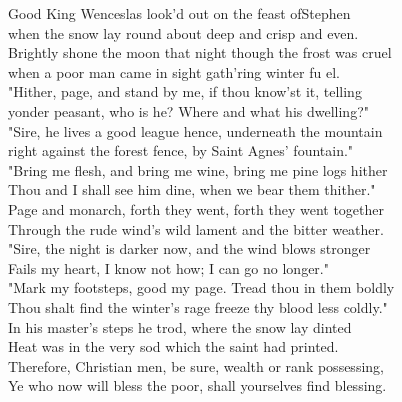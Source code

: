 
Good King Wenceslas look'd out on the  feast ofStephen\\
when the snow lay round about deep and crisp and even.\\
Brightly shone the   moon that night though the frost was  cruel\\
when a poor man came in sight gath'ring winter fu \hspace{0,5cm} el.\\

"Hither, page, and stand by me, if thou know'st it, telling\\
yonder peasant, who is he? Where and what his dwelling?"\\
"Sire, he lives a good league hence, underneath the mountain\\
right against the forest fence, by Saint Agnes' fountain."\\

"Bring me flesh, and bring me wine, bring me pine logs hither\\
Thou and I shall see him dine, when we bear them thither."\\
Page and monarch, forth they went, forth they went together\\
Through the rude wind's wild lament and the bitter weather.\\

"Sire, the night is darker now, and the wind blows stronger\\
Fails my heart, I know not how; I can go no longer."\\
"Mark my footsteps, good my page. Tread thou in them boldly\\
Thou shalt find the winter's rage freeze thy blood less coldly."\\

In his master's steps he trod, where the snow lay dinted\\
Heat was in the very sod which the saint had printed.\\
Therefore, Christian men, be sure, wealth or rank possessing,\\
Ye who now will bless the poor, shall yourselves find blessing.

\newpage
